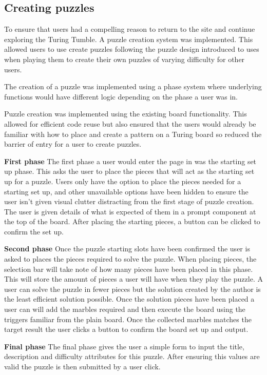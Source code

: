 \documentclass{l4proj}
\begin{document}
\subsection{Creating puzzles}
To ensure that users had a compelling reason to return to the site and continue exploring the Turing Tumble. A puzzle creation system was implemented. This allowed users to use create puzzles following the puzzle design introduced to uses when playing them to create their own puzzles of varying difficulty for other users.

The creation of a puzzle was implemented using a phase system where underlying functions would have different logic depending on the phase a user was in. 

Puzzle creation was implemented using the existing board functionality. This allowed for efficient code reuse but also ensured that the users would already be familiar with how to place and create a pattern on a Turing board so reduced the barrier of entry for a user to create puzzles.

\textbf{First phase}
The first phase a user would enter the page in was the starting set up phase. This asks the user to place the pieces that will act as the starting set up for a puzzle. Users only have the option to place the pieces needed for a starting set up, and other unavailable options have been hidden to ensure the user isn't given visual clutter distracting from the first stage of puzzle creation. The user is given details of what is expected of them in a prompt component at the top of the board. After placing the starting pieces, a button can be clicked to confirm the set up. 

\textbf{Second phase}
Once the puzzle starting slots have been confirmed the user is asked to places the pieces required to solve the puzzle. When placing pieces, the selection bar will take note of how many pieces have been placed in this phase. This will store the amount of pieces a user will have when they play the puzzle. A user can solve the puzzle in fewer pieces but the solution created by the author is the least efficient solution possible. Once the solution pieces have been placed a user can will add the marbles required and then execute the board using the triggers familiar from the plain board. Once the collected marbles matches the target result the user clicks a button to confirm the board set up and output.

\textbf{Final phase}
The final phase gives the user a simple form to input the title, description and difficulty attributes for this puzzle. After ensuring this values are valid the puzzle is then submitted by a user click.
\end{document}
